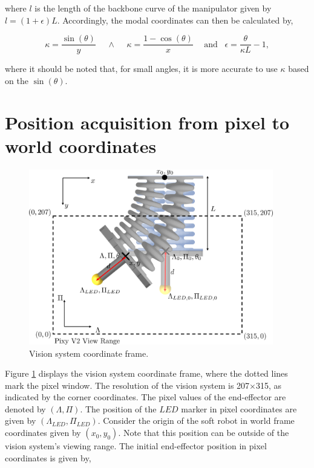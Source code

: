 where $l$ is the length of the backbone curve of the manipulator given by $l = (1+\epsilon)L$. Accordingly, the modal coordinates can then be calculated by,

\begin{equation}
    \kappa = \frac{\sin(\theta)}{y} \hspace{15pt} 	\land \hspace{15pt}  \kappa = \frac{1 -\cos(\theta)}{x} \hspace{15pt} \text{and} \hspace{10pt} \epsilon = \frac{\theta}{\kappa L} -1,
\end{equation}

where it should be noted that, for small angles, it is more accurate to use $\kappa$ based on the $\sin(\theta)$.



\label{app:chap5}

\section{Position acquisition from pixel to world coordinates}

\begin{figure}[H]
    \centering
    \includegraphics[width = 0.95\textwidth]{Figures/Appendix5/pix2w.png}
    \caption{Vision system coordinate frame.}
    \label{figapp5:px2w}
\end{figure}


Figure \ref{figapp5:px2w} displays the vision system coordinate frame, where the dotted lines mark the pixel window. The resolution of the vision system is 207$\times$315, as indicated by the corner coordinates. The pixel values of the end-effector are denoted by $(\Lambda,\Pi)$. The position of the $LED$ marker in pixel coordinates are given by $(\Lambda_{LED},\Pi_{LED})$. Consider the origin of the soft robot in world frame coordinates given by $(x_0,y_0)$. Note that this position can be outside of the vision system's viewing range. The initial end-effector position in pixel coordinates is given by,


